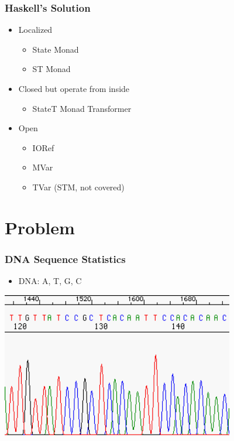 \begin{frame}\frametitle{Haskell's Solution}

\begin{itemize}
\item
  Localized

  \begin{itemize}
  \item
    State Monad
  \item
    ST Monad
  \end{itemize}
\item
  Closed but operate from inside

  \begin{itemize}
  \item
    StateT Monad Transformer
  \end{itemize}
\item
  Open

  \begin{itemize}
  \item
    IORef
  \item
    MVar
  \item
    TVar (STM, not covered)
  \end{itemize}
\end{itemize}

\end{frame}

\section{Problem}

\begin{frame}\frametitle{DNA Sequence Statistics}

\begin{itemize}
\item
  DNA: A, T, G, C
\end{itemize}

\includegraphics[width=4in]{img/normal3730.png}

\end{frame}

